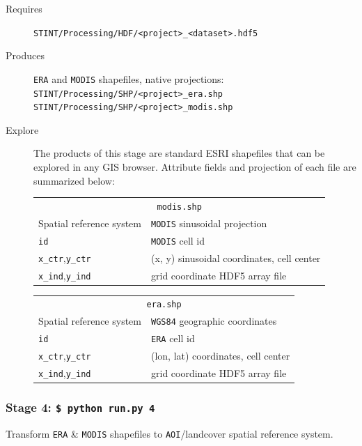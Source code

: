 \documentclass[twoside,a4paper]{refart}
\begin{document}
  \begin{description}
    \item [Requires]
          \texttt{STINT/Processing/HDF/<project>\_<dataset>.hdf5}
  
  
    \item [Produces]
      \texttt{ERA} and \texttt{MODIS} shapefiles, native projections:\\
      \texttt{STINT/Processing/SHP/<project>\_era.shp} \\
      \texttt{STINT/Processing/SHP/<project>\_modis.shp} 
      

    \item [Explore]
      The products of this stage are standard ESRI shapefiles that can be explored in any GIS browser.  Attribute fields and projection of each file are summarized below:
      
\begin{tabular}{ll}
       \multicolumn{2}{c}{\texttt{modis.shp}} \\
Spatial reference system        & \texttt{MODIS} sinusoidal projection \\
\texttt{id}                     & \texttt{MODIS} cell id \\  
\texttt{x\_ctr},\texttt{y\_ctr} &  (x, y) sinusoidal coordinates, cell center\\
\texttt{x\_ind},\texttt{y\_ind} & grid coordinate HDF5 array file\\
\end{tabular}
      
\begin{tabular}{ll}
       \multicolumn{2}{c}{ \texttt{era.shp}} \\
Spatial reference system        & \texttt{WGS84} geographic coordinates \\
\texttt{id}                     & \texttt{ERA} cell id\\
\texttt{x\_ctr},\texttt{y\_ctr} & (lon, lat) coordinates, cell center \\ 
\texttt{x\_ind},\texttt{y\_ind} & grid coordinate HDF5 array file\\
\end{tabular}

  \end{description}


\subsubsection{\textbf{Stage 4:} \texttt{\$ python run.py 4}}
Transform \texttt{ERA} \& \texttt{MODIS} shapefiles to \texttt{AOI}/landcover spatial reference system.
        
\end{document}
